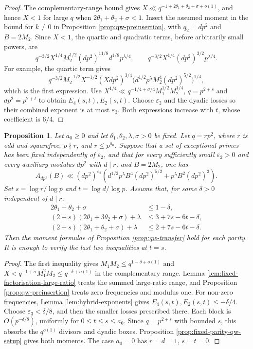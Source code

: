 \documentclass[12pt, a4paper]{amsart}
\numberwithin{equation}{section}
\renewcommand{\le}{\leqslant}
\renewcommand{\ge}{\geqslant}
\theoremstyle{plain}
\newtheorem{prop}[lem]{Proposition}
\begin{document}
\begin{proof}
The complementary-range bound gives $X\ll q^{-1+2\theta_1+\theta_2+\sigma+o(1)}$, and hence $X<1$ for large $q$ when $2\theta_1+\theta_2+\sigma<1$. Insert the assumed moment in the bound for $k\ne0$ in Proposition \ref{prop:qw-preinsertion}, with $q_2=dp^2$ and $B=2M_2$. Since $X<1$, the quartic and quadratic terms, before arbitrarily small powers, are
$$
q^{-3/2}X^{1/4}M_2^{1/2}(dp^2)^{11/8}d^{1/8}p^{\lambda/4},
\qquad
q^{-3/2}X^{1/4}(dp^2)^{3/2}p^{\lambda/4}.
$$
For example, the quartic term gives
$$
q^{-3/2}M_2^{-1/2}X^{-1/2}(Xdp^2)^{3/4}\bigl(d^{1/2}p^{\lambda}M_2^4(dp^2)^{5/2}\bigr)^{1/4},
$$
which is the first expression. Use $X^{1/4}\ll q^{-1/4+\sigma/4}M_1^{1/2}M_2^{1/4}$, $q=p^{2+s}$ and $dp^2=p^{2+t}$ to obtain $E_4(s,t),E_2(s,t)$. Choose $\varepsilon_2$ and the dyadic losses so their combined exponent is at most $\varepsilon_3$. Both expressions increase with $t$, whose coefficient is $6/4$.
\end{proof}

\begin{prop}\label{prop:hybrid-transfer}
Let $a_0\ge0$ and let $\theta_1,\theta_2,\lambda,\sigma>0$ be fixed. Let $q=rp^2$, where $r$ is odd and squarefree, $p\nmid r$, and $r\le p^{a_0}$. Suppose that a set of exceptional primes has been fixed independently of $\varepsilon_2$, and that for every sufficiently small $\varepsilon_2>0$ and every auxiliary modulus $dp^2$ with $d\mid r$, and $B=2M_2$, one has
$$
A_{dp^2}(B)\ll (dp^2)^{\varepsilon_2}
\left(d^{1/2}p^\lambda B^4(dp^2)^{5/2}
+p^\lambda B^2(dp^2)^3\right).
$$
Set $s=\log r/\log p$ and $t=\log d/\log p$. Assume that, for some $\delta>0$ independent of $d\mid r$,
$$
\begin{aligned}
2\theta_1+\theta_2+\sigma&\le1-\delta,\\
(2+s)(2\theta_1+3\theta_2+\sigma)+\lambda
&\le3+7s-6t-\delta,\\
(2+s)(2\theta_1+\theta_2+\sigma)+\lambda
&\le2+7s-6t-\delta.
\end{aligned}
$$
Then the moment formulae of Proposition \ref{prop:qw-transfer} hold for each parity. It is enough to verify the last two inequalities at $t=s$.
\end{prop}

\begin{proof}
The first inequality gives $M_1M_2\le q^{1-\delta+o(1)}$ and $X<q^{-1+\sigma}M_1^2M_2\le q^{-\delta+o(1)}$ in the complementary range. Lemma \ref{lem:fixed-factorisation-large-ratio} treats the summed large-ratio range, and Proposition \ref{prop:qw-preinsertion} treats zero frequencies and modulus one. For non-zero frequencies, Lemma \ref{lem:hybrid-exponents} gives $E_4(s,t),E_2(s,t)\le-\delta/4$. Choose $\varepsilon_3<\delta/8$, and then the smaller losses prescribed there. Each block is $O(p^{-\delta/8})$, uniformly for $0\le t\le s\le a_0$. Since $q=p^{2+s}$ with bounded $s$, this absorbs the $q^{o(1)}$ divisors and dyadic boxes. Proposition \ref{prop:fixed-parity-qw-setup} gives both moments. The case $a_0=0$ has $r=d=1$, $s=t=0$.
\end{proof}
\end{document}
